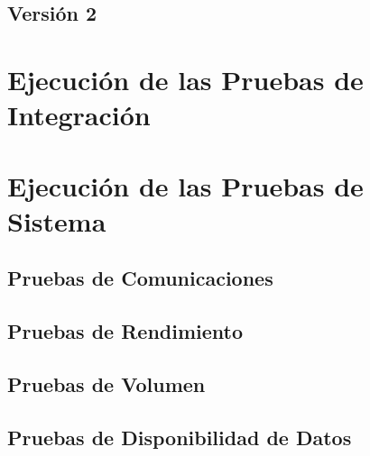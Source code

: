 \subsection{Versión 2}



\section{Ejecución de las Pruebas de Integración}




\newpage
\section{Ejecución de las Pruebas de Sistema}{
\subsection{Pruebas de Comunicaciones}

\newpage

\newpage
\subsection{Pruebas de Rendimiento}

\newpage

\newpage
\subsection{Pruebas de Volumen}

\newpage

\newpage

\newpage
\subsection{Pruebas de Disponibilidad de Datos}



\newpage



}

